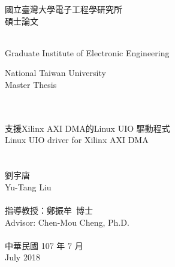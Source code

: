 \begin{titlepage}
  \begin{center}

    {\fontsize{18}{27}\selectfont
    國立臺灣大學電子工程學研究所\\
    碩士論文\\
    }

    \small{~}\\

    {\fontsize{14}{21}\selectfont
    Graduate Institute of Electronic Engineering\\
    }

    {\fontsize{16}{24}\selectfont
    National Taiwan University\\
    Master Thesis\\
    }

    {\fontsize{18}{27}\selectfont
    ~\\
    ~\\

    支援Xilinx AXI DMA的Linux UIO 驅動程式\\
    Linux UIO driver for Xilinx AXI DMA\\

    ~\\
    ~\\

    劉宇唐\\
    Yu-Tang Liu\\

    ~\\

    指導教授：鄭振牟~博士\\
    Advisor: Chen-Mou Cheng, Ph.D.\\

    ~\\

    中華民國 107 年 7 月\\
    July 2018\\
    }

  \end{center}
\end{titlepage}
